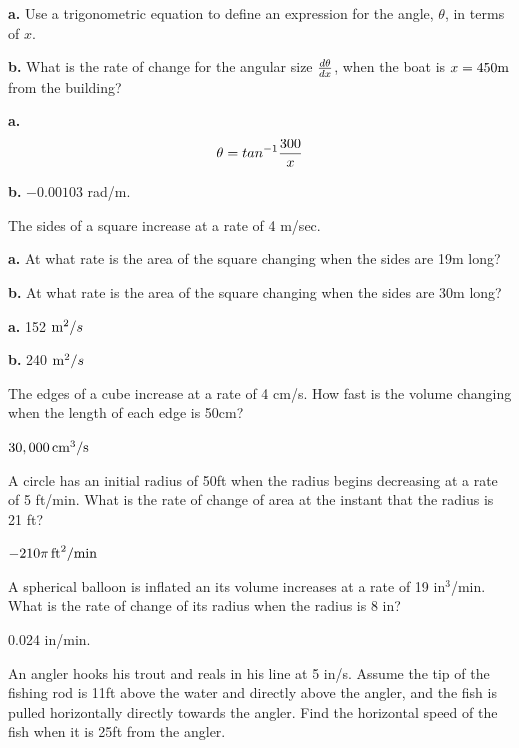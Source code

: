 \par {\bf a.}
Use a trigonometric equation to define an expression
for the angle, $\theta$, in terms of $x$.

\par {\bf b.}
What is the rate of change for the angular size ${d\theta \over dx}$,
when the boat is $x = 450 \hbox{m}$ from the building?

\bigskip

\par {\bf a.}
$$\theta = tan^{-1}{300 \over x}$$

\par {\bf b.}
$-0.00103$ rad/m.

\bigskip

The sides of a square increase at a rate of 4 m/sec.

\par {\bf a.}
At what rate is the area of the square changing
when the sides are 19m long?

\par {\bf b.}
At what rate is the area of the square changing
when the sides are 30m long?

\bigskip

\par {\bf a.} 152 $\hbox{m}^2/s$
\par {\bf b.} 240 $\hbox{m}^2/s$

\bigskip

The edges of a cube increase at a rate of 4 cm/s. How
fast is the volume changing when the length of each edge
is 50cm?
\bigskip

$30,000 \, \hbox{cm}^3/\hbox{s}$

A circle has an initial radius of 50ft when the radius
begins decreasing at a rate of 5 ft/min. What is the rate
of change of area at the instant that the radius is 21 ft?

\bigskip

$-210\pi \, \hbox{ft}^2 / \hbox{min}$

\bigskip

A spherical balloon is inflated an its volume increases
at a rate of 19 in$^3$/min. What is the rate of change of its
radius when the radius is 8 in?
\bigskip

0.024 in/min. \bigskip

An angler hooks his trout and reals in his line at 5 in/s.
Assume the tip of the fishing rod is 11ft above the water
and directly above the angler, and the fish is pulled horizontally
directly towards the angler. Find the horizontal speed of the fish
when it is 25ft from the angler.

